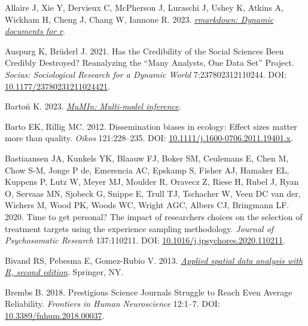 \documentclass[10pt,a4paper]{article}
\newlength{\cslhangindent}
\newlength{\cslentryspacingunit} %
\newenvironment{CSLReferences}[2] %
 {%
  \setlength{\parindent}{0pt}
  \ifodd #1
  \let\oldpar\par
  \def\par{\hangindent=\cslhangindent\oldpar}
  \fi
  \setlength{\parskip}{#2\cslentryspacingunit}
 }%
 {}
\begin{document}
\hypertarget{refs}{}
\begin{CSLReferences}{1}{0}
\leavevmode{}%
Allaire J, Xie Y, Dervieux C, McPherson J, Luraschi J, Ushey K, Atkins A, Wickham H, Cheng J, Chang W, Iannone R. 2023. \emph{\href{https://github.com/rstudio/rmarkdown}{{rmarkdown}: Dynamic documents for r}}.

\leavevmode{}%
Auspurg K, Brüderl J. 2021. Has the {Credibility} of the {Social} {Sciences} {Been} {Credibly} {Destroyed}? {Reanalyzing} the {``{Many} {Analysts}, {One} {Data} {Set}''} {Project}. \emph{Socius: Sociological Research for a Dynamic World} 7:237802312110244. DOI: \href{https://doi.org/10.1177/23780231211024421}{10.1177/23780231211024421}.

\leavevmode{}%
Bartoń K. 2023. \emph{\href{https://CRAN.R-project.org/package=MuMIn}{MuMIn: Multi-model inference}}.

\leavevmode{}%
Barto EK, Rillig MC. 2012. Dissemination biases in ecology: Effect sizes matter more than quality. \emph{Oikos} 121:228--235. DOI: \href{https://doi.org/10.1111/j.1600-0706.2011.19401.x}{10.1111/j.1600-0706.2011.19401.x}.

\leavevmode{}%
Bastiaansen JA, Kunkels YK, Blaauw FJ, Boker SM, Ceulemans E, Chen M, Chow S-M, Jonge P de, Emerencia AC, Epskamp S, Fisher AJ, Hamaker EL, Kuppens P, Lutz W, Meyer MJ, Moulder R, Oravecz Z, Riese H, Rubel J, Ryan O, Servaas MN, Sjobeck G, Snippe E, Trull TJ, Tschacher W, Veen DC van der, Wichers M, Wood PK, Woods WC, Wright AGC, Albers CJ, Bringmann LF. 2020. Time to get personal? {The} impact of researchers choices on the selection of treatment targets using the experience sampling methodology. \emph{Journal of Psychosomatic Research} 137:110211. DOI: \href{https://doi.org/10.1016/j.jpsychores.2020.110211}{10.1016/j.jpsychores.2020.110211}.

\leavevmode{}%
Bivand RS, Pebesma E, Gomez-Rubio V. 2013. \emph{\href{https://asdar-book.org/}{Applied spatial data analysis with {R}, second edition}}. Springer, NY.

\leavevmode{}%
Brembs B. 2018. Prestigious {Science} {Journals} {Struggle} to {Reach} {Even} {Average} {Reliability}. \emph{Frontiers in Human Neuroscience} 12:1--7. DOI: \href{https://doi.org/10.3389/fnhum.2018.00037}{10.3389/fnhum.2018.00037}.


\end{CSLReferences}
\end{document}
